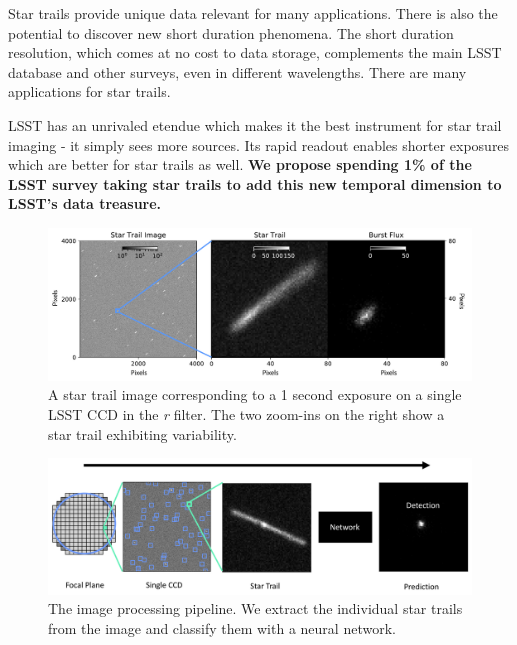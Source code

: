 \documentclass[12pt, letterpaper]{article}
\begin{document}
Star trails provide unique data relevant for many applications. There is also the potential to discover new short duration phenomena. The short duration resolution, which comes at no cost to data storage, complements the main LSST database and other surveys, even in different wavelengths. There are many applications for star trails. 

LSST has an unrivaled etendue which makes it the best instrument for star trail imaging - it simply sees more sources. Its rapid readout enables shorter exposures which are better for star trails as well. \textbf{We propose spending 1\% of the LSST survey taking star trails to add this new temporal dimension to LSST's data treasure.}

\begin{figure}[htb]
\center
\includegraphics[width=1.00\columnwidth]{star_trail.pdf}
\caption{A star trail image corresponding to a 1 second exposure on a single LSST CCD in the \textit{r} filter. The two zoom-ins on the right show a star trail exhibiting variability.}
\label{fig:trail}
\end{figure}

\begin{figure}[htb!]
\center
\includegraphics[width=\columnwidth]{pipeline2.png}
\caption{The image processing pipeline. We extract the individual star trails from the image and classify them with a neural network.}
\label{fig:pipeline}
\end{figure}
\end{document}
